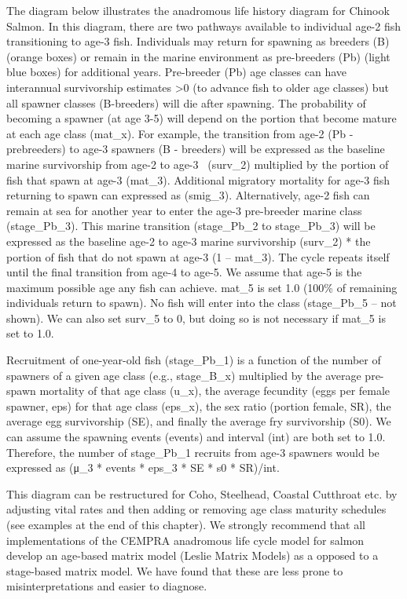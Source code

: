 \documentclass[
  letterpaper,
  DIV=11,
  numbers=noendperiod]{scrreprt}
\begin{document}
The diagram below illustrates the anadromous life history diagram for
Chinook Salmon. In this diagram, there are two pathways available to
individual age-2 fish transitioning to age-3 fish. Individuals may
return for spawning as breeders (B) (orange boxes) or remain in the
marine environment as pre-breeders (Pb) (light blue boxes) for
additional years. Pre-breeder (Pb) age classes can have interannual
survivorship estimates \textgreater0 (to advance fish to older age
classes) but all spawner classes (B-breeders) will die after spawning.
The probability of becoming a spawner (at age 3-5) will depend on the
portion that become mature at each age class (mat\_x). For example, the
transition from age-2 (Pb - prebreeders) to age-3 spawners (B -
breeders) will be expressed as the baseline marine survivorship from
age-2 to age-3 ~(surv\_2) multiplied by the portion of fish that spawn
at age-3 (mat\_3). Additional migratory mortality for age-3 fish
returning to spawn can expressed as (smig\_3). Alternatively, age-2 fish
can remain at sea for another year to enter the age-3 pre-breeder marine
class (stage\_Pb\_3). This marine transition (stage\_Pb\_2 to
stage\_Pb\_3) will be expressed as the baseline age-2 to age-3 marine
survivorship (surv\_2) * the portion of fish that do not spawn at age-3
(1 -- mat\_3). The cycle repeats itself until the final transition from
age-4 to age-5. We assume that age-5 is the maximum possible age any
fish can achieve. mat\_5 is set 1.0 (100\% of remaining individuals
return to spawn). No fish will enter into the class (stage\_Pb\_5 -- not
shown). We can also set surv\_5 to 0, but doing so is not necessary if
mat\_5 is set to 1.0.

Recruitment of one-year-old fish (stage\_Pb\_1) is a function of the
number of spawners of a given age class (e.g., stage\_B\_x) multiplied
by the average pre-spawn mortality of that age class (u\_x), the average
fecundity (eggs per female spawner, eps) for that age class (eps\_x),
the sex ratio (portion female, SR), the average egg survivorship (SE),
and finally the average fry survivorship (S0). We can assume the
spawning events (events) and interval (int) are both set to 1.0.
Therefore, the number of stage\_Pb\_1 recruits from age-3 spawners would
be expressed as (μ\_3 * events * eps\_3 * SE * s0 * SR)/int.

This diagram can be restructured for Coho, Steelhead, Coastal Cutthroat
etc. by adjusting vital rates and then adding or removing age class
maturity schedules (see examples at the end of this chapter). We
strongly recommend that all implementations of the CEMPRA anadromous
life cycle model for salmon develop an age-based matrix model (Leslie
Matrix Models) as a opposed to a stage-based matrix model. We have found
that these are less prone to misinterpretations and easier to diagnose.
\end{document}
